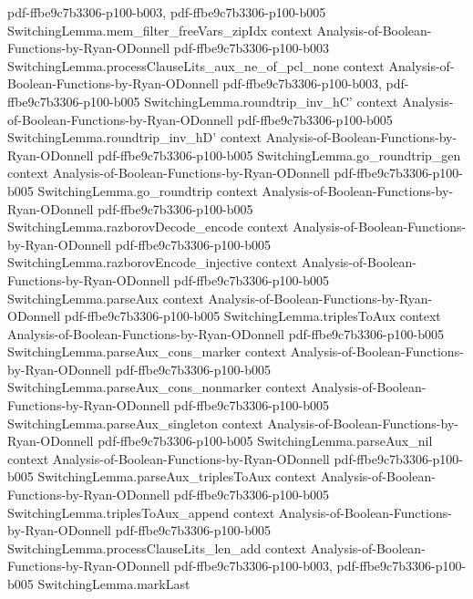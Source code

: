 \begin{lemma}
  {pdf-ffbe9c7b3306-p100-b003,
    pdf-ffbe9c7b3306-p100-b005}
\proofstep
  {SwitchingLemma.mem_filter_freeVars_zipIdx}
  {context}
  {Analysis-of-Boolean-Functions-by-Ryan-ODonnell}
  {pdf-ffbe9c7b3306-p100-b003}
\proofstep
  {SwitchingLemma.processClauseLits_aux_ne_of_pcl_none}
  {context}
  {Analysis-of-Boolean-Functions-by-Ryan-ODonnell}
  {pdf-ffbe9c7b3306-p100-b003,
    pdf-ffbe9c7b3306-p100-b005}
\proofstep
  {SwitchingLemma.roundtrip_inv_hC'}
  {context}
  {Analysis-of-Boolean-Functions-by-Ryan-ODonnell}
  {pdf-ffbe9c7b3306-p100-b005}
\proofstep
  {SwitchingLemma.roundtrip_inv_hD'}
  {context}
  {Analysis-of-Boolean-Functions-by-Ryan-ODonnell}
  {pdf-ffbe9c7b3306-p100-b005}
\proofstep
  {SwitchingLemma.go_roundtrip_gen}
  {context}
  {Analysis-of-Boolean-Functions-by-Ryan-ODonnell}
  {pdf-ffbe9c7b3306-p100-b005}
\proofstep
  {SwitchingLemma.go_roundtrip}
  {context}
  {Analysis-of-Boolean-Functions-by-Ryan-ODonnell}
  {pdf-ffbe9c7b3306-p100-b005}
\proofstep
  {SwitchingLemma.razborovDecode_encode}
  {context}
  {Analysis-of-Boolean-Functions-by-Ryan-ODonnell}
  {pdf-ffbe9c7b3306-p100-b005}
\proofstep
  {SwitchingLemma.razborovEncode_injective}
  {context}
  {Analysis-of-Boolean-Functions-by-Ryan-ODonnell}
  {pdf-ffbe9c7b3306-p100-b005}
\proofstep
  {SwitchingLemma.parseAux}
  {context}
  {Analysis-of-Boolean-Functions-by-Ryan-ODonnell}
  {pdf-ffbe9c7b3306-p100-b005}
\proofstep
  {SwitchingLemma.triplesToAux}
  {context}
  {Analysis-of-Boolean-Functions-by-Ryan-ODonnell}
  {pdf-ffbe9c7b3306-p100-b005}
\proofstep
  {SwitchingLemma.parseAux_cons_marker}
  {context}
  {Analysis-of-Boolean-Functions-by-Ryan-ODonnell}
  {pdf-ffbe9c7b3306-p100-b005}
\proofstep
  {SwitchingLemma.parseAux_cons_nonmarker}
  {context}
  {Analysis-of-Boolean-Functions-by-Ryan-ODonnell}
  {pdf-ffbe9c7b3306-p100-b005}
\proofstep
  {SwitchingLemma.parseAux_singleton}
  {context}
  {Analysis-of-Boolean-Functions-by-Ryan-ODonnell}
  {pdf-ffbe9c7b3306-p100-b005}
\proofstep
  {SwitchingLemma.parseAux_nil}
  {context}
  {Analysis-of-Boolean-Functions-by-Ryan-ODonnell}
  {pdf-ffbe9c7b3306-p100-b005}
\proofstep
  {SwitchingLemma.parseAux_triplesToAux}
  {context}
  {Analysis-of-Boolean-Functions-by-Ryan-ODonnell}
  {pdf-ffbe9c7b3306-p100-b005}
\proofstep
  {SwitchingLemma.triplesToAux_append}
  {context}
  {Analysis-of-Boolean-Functions-by-Ryan-ODonnell}
  {pdf-ffbe9c7b3306-p100-b005}
\proofstep
  {SwitchingLemma.processClauseLits_len_add}
  {context}
  {Analysis-of-Boolean-Functions-by-Ryan-ODonnell}
  {pdf-ffbe9c7b3306-p100-b003,
    pdf-ffbe9c7b3306-p100-b005}
\proofstep
  {SwitchingLemma.markLast}

\end{lemma}
